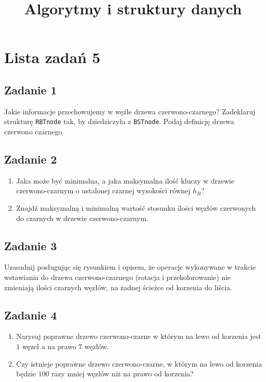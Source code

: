 \documentclass{article}
\begin{document}
\title{Algorytmy i struktury danych}
\author{}
\date{}
\maketitle

\section*{Lista zadań 5}

\subsection*{Zadanie 1}
Jakie informacje przechowujemy w węźle drzewa czerwono-czarnego?
Zadeklaruj strukturę \verb+RBTnode+ tak, by dziedziczyła z \verb+BSTnode+. Podaj definicję drzewa czerwono czarnego.

\subsection*{Zadanie 2}
\begin{enumerate}[label=(\alph*)]
    \item Jaka może być minimalna, a jaka maksymalna ilość kluczy w drzewie czerwono-czarnym
          o ustalonej czarnej wysokości równej $h_B$?
    \item Znajdź maksymalną i minimalną wartość stosunku ilości węzłów czerwonych do
          czarnych w drzewie czerwono-czarnym.
\end{enumerate}

\subsection*{Zadanie 3}
Uzasadnij posługując się rysunkiem i opisem, że operacje wykonywane w trakcie wstawiania
do drzewa czerwono-czarnego (rotacja i przekolorowanie) nie zmieniają ilości
czarnych węzłów, na żadnej ścieżce od korzenia do liścia.

\subsection*{Zadanie 4}
\begin{enumerate}[label=(\alph*)]
    \item Narysuj poprawne drzewo czerwono-czarne w którym na lewo od korzenia jest $1$
          węzeł a na prawo $7$ węzłów.
    \item Czy istnieje poprawne drzewo czerwono-czarne, w którym na lewo od korzenia będzie
          $100$ razy mniej węzłów niż na prawo od korzenia?
\end{enumerate}
\end{document}

